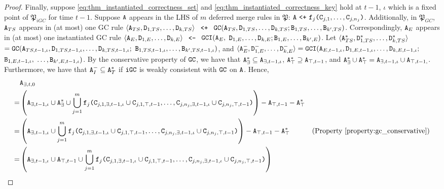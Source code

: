\begin{proof}
Finally, suppose \eqref{eq:thm_instantiated_correctness_set} and \eqref{eq:thm_instantiated_correctness_key} hold at $t-1$, $\iota$ which is a fixed point of $\mathfrak{P}_{iGC}$ for time $t-1$.
Suppose $\tt{A}$ appears in the LHS of $m$ deferred merge rules in $\mathfrak{P}$: $\tt{A} ~\tt{<+}~ \tt{f}_j\tt{(}\tt{C}_{j,1},\dots,\tt{C}_{j,n_j}\tt{)}$.
Additionally, in $\mathfrak{P}_{GC}$, $\tt{A}_{TS}$ appears in (at most) one GC rule $\langle \tt{A}_{TS}, \tt{D}_{1,TS}, \dots, \tt{D}_{k,TS} \rangle$ $~\tt{<+}~$ $\tt{GC}(\tt{A}_{TS}, \tt{D}_{1,TS}, \dots, \tt{D}_{k,TS}; \tt{B}_{1,TS}, \dots, \tt{B}_{k',TS})$.
Correspondingly, $\tt{A}_E$ appears in (at most) one instantiated GC rule $\langle \tt{A}_E, \tt{D}_{1,E}, \dots, \tt{D}_{k,E} \rangle$ $~\tt{<-}~$ $\tt{GCI}(\tt{A}_{E},$ $\tt{D}_{1,E}, \dots, \tt{D}_{k,E}; \tt{B}_{1,E}, \dots, \tt{B}_{k',E})$.
Let $\langle \tt{A}_{TS}^*, \tt{D}_{1,TS}^*, \dots, \tt{D}_{k,TS}^* \rangle$ $= \tt{GC}(\tt{A}_{TS,t-1,\iota}, \tt{D}_{1,TS,t-1,\iota}, \dots, \tt{D}_{k,TS,t-1,\iota};$ $\tt{B}_{1,TS,t-1,\iota}, \dots, \tt{B}_{k',TS,t-1,\iota})$, and
$\langle \tt{A}_E^-, \tt{D}_{1,E}^-, \dots, \tt{D}_{k,E}^- \rangle = \tt{GCI}(\tt{A}_{E,t-1,\iota}, \tt{D}_{1,E,t-1,\iota}, \dots, \tt{D}_{k,E,t-1,\iota};$ $\tt{B}_{1,E,t-1,\iota},$ $\dots, \tt{B}_{k',E,t-1,\iota})$.
By the conservative property of $\tt{GC}$, we have that $\tt{A}_{\exists}^* \subseteq \tt{A}_{\exists,t-1,\iota}$, $\tt{A}_{\top}^* \supseteq \tt{A}_{\top,t-1}$, and $\tt{A}_{\exists}^* \cup \tt{A}_{\top}^* = \tt{A}_{\exists,t-1,\iota} \cup \tt{A}_{\top,t-1,}$.
Furthermore, we have that $\tt{A}_I^- \subseteq \tt{A}_{T}^*$ if $\tt{iGC}$ is weakly consistent with $\tt{GC}$ on $\tt{A}$.
Hence,
\begin{align}
&\tt{A}_{\exists,t,0}\nonumber\\
=& \left(\tt{A}_{\exists,t-1,\iota} \cup \tt{A}_\exists^* \cup \bigcup_{j=1}^m \tt{f}_j\tt{(}\tt{C}_{j,1,\exists,t-1,\iota} \cup \tt{C}_{j,1,\top,t-1}, \dots, \tt{C}_{j,n_j,\exists,t-1,\iota} \cup \tt{C}_{j,n_j,\top,t-1}\tt{)}\right)
- \tt{A}_{\top,t-1} - \tt{A}_\top^*\nonumber\\
=& \left(\tt{A}_{\exists,t-1,\iota} \cup \bigcup_{j=1}^m \tt{f}_j\tt{(}\tt{C}_{j,1,\exists,t-1,\iota} \cup \tt{C}_{j,1,\top,t-1}, \dots, \tt{C}_{j,n_j,\exists,t-1,\iota} \cup \tt{C}_{j,n_j,\top,t-1}\tt{)}\right)
- \tt{A}_{\top,t-1} - \tt{A}_\top^* & \text{(Property \ref{property:gc_conservative})}\nonumber\\
=& \left(\tt{A}_{\exists,t-1,\iota} \cup \tt{A}_{\top,t-1} \cup \bigcup_{j=1}^m \tt{f}_j\tt{(}\tt{C}_{j,1,\exists,t-1,\iota} \cup \tt{C}_{j,1,\top,t-1}, \dots, \tt{C}_{j,n_j,\exists,t-1,\iota} \cup \tt{C}_{j,n_j,\top,t-1}\tt{)}\right)

\end{align}
\end{proof}
